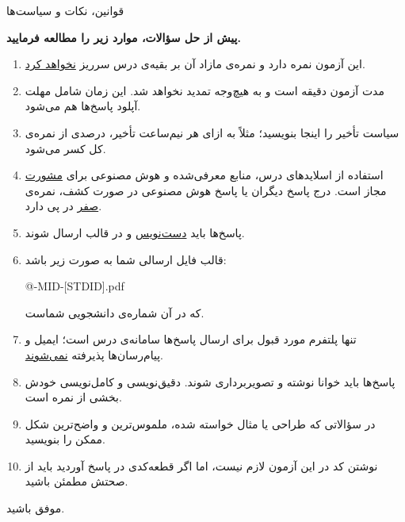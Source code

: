 \begin{neobox}[neotitlefont=\pixelfont]{قوانین، نکات و سیاست‌ها}

    \vspace{5mm}
    \begin{center}
        {\large \textbf{پیش از حل سؤالات، موارد زیر را مطالعه فرمایید.}}
    \end{center}
    \vspace{5mm}

    \begin{enumerate}
        \item این آزمون \examgrade{} نمره دارد و نمره‌ی مازاد آن بر بقیه‌ی درس
              سرریز \underline{نخواهد کرد}.

        \item مدت آزمون \examtime{} دقیقه است و به هیچ‌وجه تمدید نخواهد شد. این
              زمان شامل مهلت آپلود پاسخ‌ها هم می‌شود.

        \item سیاست تأخیر را اینجا بنویسید؛ مثلاً به ازای هر نیم‌ساعت تأخیر،
              درصدی از نمره‌ی کل کسر می‌شود.

        \item استفاده از اسلایدهای درس، منابع معرفی‌شده و هوش مصنوعی برای
              \underline{مشورت} مجاز است. درج پاسخ دیگران یا پاسخ هوش مصنوعی
              در صورت کشف، نمره‌ی \underline{صفر} در پی دارد.

        \item پاسخ‌ها باید \underline{دست‌نویس} و در قالب  ارسال شوند.

        \item {
              قالب فایل ارسالی شما به صورت زیر باشد:
              \begin{neocode}[neocodetitlefont=\small]{}
@\coursecode@-MID-[STDID].pdf
              \end{neocode}
              که در آن  شماره‌ی دانشجویی شماست.
              }

        \item تنها پلتفرم مورد قبول برای ارسال پاسخ‌ها سامانه‌ی درس است؛ ایمیل و
              پیام‌رسان‌ها پذیرفته \underline{نمی‌شوند}.

        \item پاسخ‌ها باید خوانا نوشته و تصویربرداری شوند. دقیق‌نویسی و
              کامل‌نویسی خودش بخشی از نمره است.

        \item در سؤالاتی که طراحی یا مثال خواسته شده، ملموس‌ترین و واضح‌ترین
              شکل ممکن را بنویسید.

        \item نوشتن کد در این آزمون لازم نیست، اما اگر قطعه‌کدی در پاسخ آوردید
              باید از صحتش مطمئن باشید.
    \end{enumerate}

    \vspace{5mm}

    موفق باشید.

\end{neobox}
